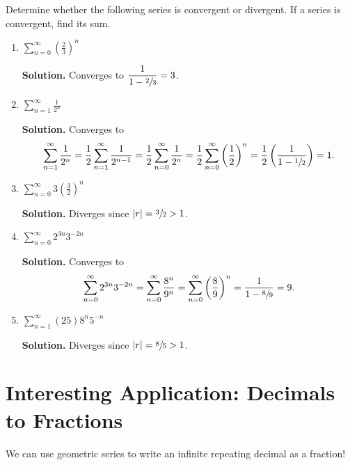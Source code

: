 \setcounter{section}{2}
\begin{Example}{}{}
    Determine whether the following series is convergent or divergent. If a series is
    convergent, find its sum.
    \begin{enumerate}[label=(\roman*)]
        \item $ \displaystyle\sum\limits_{n=0}^{\infty} \left( \frac{2}{3}  \right)^n $

              \textbf{Solution.} Converges to
              $ \displaystyle \frac{1}{1-\sfrac{2}{3}}=3 $.
        \item $ \displaystyle \sum\limits_{n=1}^{\infty} \frac{1}{2^n} $

              \textbf{Solution.} Converges to
              \[ \sum\limits_{n=1}^{\infty} \frac{1}{2^n}
                  =\frac{1}{2} \sum\limits_{n=1}^{\infty} \frac{1}{2^{n-1}}
                  =\frac{1}{2} \sum\limits_{n=0}^{\infty} \frac{1}{2^n}
                  =\frac{1}{2} \sum\limits_{n=0}^{\infty} \left( \frac{1}{2}  \right)^n
                  =\frac{1}{2} \left( \frac{1}{1-\sfrac{1}{2}}  \right)
                  =1. \]
        \item $ \displaystyle\sum\limits_{n=0}^{\infty} 3\left( \frac{3}{2}  \right)^n $

              \textbf{Solution.} Diverges since $ \lvert r\rvert=\sfrac{3}{2} >1 $.
        \item $ \displaystyle\sum\limits_{n=0}^{\infty} 2^{3n}3^{-2n} $

              \textbf{Solution.} Converges to
              \[
                  \sum\limits_{n=0}^{\infty} 2^{3n}3^{-2n}
                  =\sum\limits_{n=0}^{\infty} \frac{8^n}{9^n}
                  =\sum\limits_{n=0}^{\infty}
                  \left( \frac{8}{9}  \right)^n
                  =\frac{1}{1-\sfrac{8}{9}}
                  =9. \]
        \item $ \displaystyle\sum\limits_{n=1}^{\infty} (25) 8^n5^{-n} $

              \textbf{Solution.} Diverges since $ \lvert r\rvert=\sfrac{8}{5} >1 $.
    \end{enumerate}
\end{Example}

\section*{Interesting Application: Decimals to Fractions}
We can use geometric series to write an infinite repeating decimal as a fraction!

